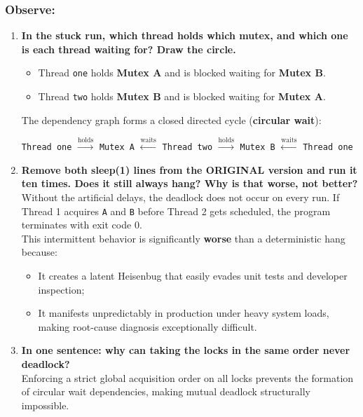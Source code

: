\documentclass{labreport}
\begin{document}
\subsubsection*{Observe:}
\begin{enumerate}[leftmargin=*]
    \item \textbf{In the stuck run, which thread holds which mutex, and which one is each thread waiting for? Draw the circle.}\\[0.2em]
    \begin{itemize}[noitemsep]
        \item Thread \texttt{one} holds \textbf{Mutex A} and is blocked waiting for \textbf{Mutex B}.
        \item Thread \texttt{two} holds \textbf{Mutex B} and is blocked waiting for \textbf{Mutex A}.
    \end{itemize}
    The dependency graph forms a closed directed cycle (\textbf{circular wait}):
    \begin{center}
        \texttt{Thread one} $\xrightarrow{\text{holds}}$ \texttt{Mutex A} $\xleftarrow{\text{waits}}$ \texttt{Thread two} $\xrightarrow{\text{holds}}$ \texttt{Mutex B} $\xleftarrow{\text{waits}}$ \texttt{Thread one}
    \end{center}

    \item \textbf{Remove both sleep(1) lines from the ORIGINAL version and run it ten times. Does it still always hang? Why is that worse, not better?}\\[0.2em]
    Without the artificial delays, the deadlock does not occur on every run. If Thread 1 acquires \texttt{A} and \texttt{B} before Thread 2 gets scheduled, the program terminates with exit code 0.\\
    This intermittent behavior is significantly \textbf{worse} than a deterministic hang because:
    \begin{itemize}[noitemsep]
        \item It creates a latent Heisenbug that easily evades unit tests and developer inspection;
        \item It manifests unpredictably in production under heavy system loads, making root-cause diagnosis exceptionally difficult.
    \end{itemize}

    \item \textbf{In one sentence: why can taking the locks in the same order never deadlock?}\\[0.2em]
    Enforcing a strict global acquisition order on all locks prevents the formation of circular wait dependencies, making mutual deadlock structurally impossible.
\end{enumerate}
\end{document}
